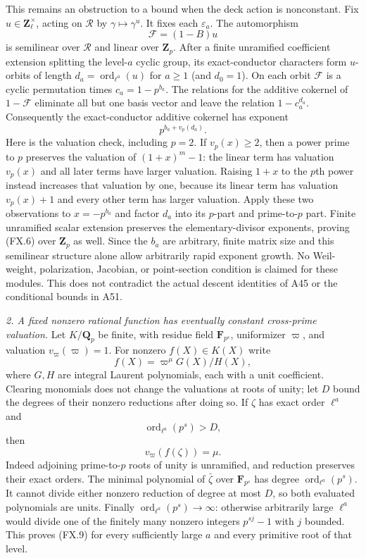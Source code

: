 This remains an obstruction to a bound when the deck action is
nonconstant. Fix $u\in\mathbf Z_\ell^\times$, acting on $\mathcal R$
by $\gamma\mapsto\gamma^u$. It fixes each $\varepsilon_a$.
The automorphism
\[
           \mathcal F=(1-B)u
 \tag{FX.5}
\]
is semilinear over $\mathcal R$ and linear over $\mathbf Z_p$.
After a finite unramified coefficient extension splitting the
level-$a$ cyclic group, its exact-conductor characters form $u$-orbits
of length $d_a=\operatorname{ord}_{\ell^a}(u)$ for $a\ge1$
(and $d_0=1$). On each orbit
$\mathcal F$ is a cyclic permutation times $c_a=1-p^{b_a}$.
The relations for the additive cokernel of $1-\mathcal F$ eliminate
all but one basis vector and leave the relation
$1-c_a^{d_a}$. Consequently the exact-conductor additive cokernel
has exponent
\[
          p^{b_a+v_p(d_a)}.
 \tag{FX.6}
\]
Here is the valuation check, including $p=2$. If $v_p(x)\ge2$,
then a power prime to $p$ preserves the valuation of $(1+x)^m-1$:
the linear term has valuation $v_p(x)$ and all later terms have
larger valuation. Raising $1+x$ to the $p$th power instead increases
that valuation by one, because its linear term has valuation
$v_p(x)+1$ and every other term has larger valuation. Apply these
two observations to $x=-p^{b_a}$ and factor $d_a$ into its $p$-part
and prime-to-$p$ part. Finite unramified scalar extension preserves
the elementary-divisor exponents, proving (FX.6) over $\mathbf Z_p$
as well. Since the $b_a$ are arbitrary, finite matrix size and this
semilinear structure alone allow arbitrarily rapid exponent growth.
No Weil-weight, polarization, Jacobian, or point-section condition
is claimed for these modules. This does not contradict the actual
descent identities of A45 or the conditional bounds in A51.

\emph{2. A fixed nonzero rational function has eventually constant
cross-prime valuation.}
Let $K/\mathbf Q_p$ be finite, with residue field
$\mathbf F_{p^s}$, uniformizer $\varpi$, and valuation
$v_\varpi(\varpi)=1$. For nonzero $f(X)\in K(X)$ write
\[
             f(X)=\varpi^\mu G(X)/H(X),
 \tag{FX.7}
\]
where $G,H$ are integral Laurent polynomials, each with a unit
coefficient. Clearing monomials does not change the valuations
at roots of unity; let $D$ bound the degrees of their nonzero
reductions after doing so. If $\zeta$ has exact order $\ell^a$ and
\[
                  \operatorname{ord}_{\ell^a}(p^s)>D,
 \tag{FX.8}
\]
then
\[
                        v_\varpi(f(\zeta))=\mu.
 \tag{FX.9}
\]
Indeed adjoining prime-to-$p$ roots of unity is unramified, and
reduction preserves their exact orders. The minimal polynomial of
$\bar\zeta$ over $\mathbf F_{p^s}$ has degree
$\operatorname{ord}_{\ell^a}(p^s)$. It cannot divide either nonzero
reduction of degree at most $D$, so both evaluated polynomials are
units. Finally $\operatorname{ord}_{\ell^a}(p^s)\to\infty$:
otherwise arbitrarily large $\ell^a$ would divide one of the
finitely many nonzero integers $p^{sj}-1$ with $j$ bounded.
This proves (FX.9) for every sufficiently large $a$ and every
primitive root of that level.


